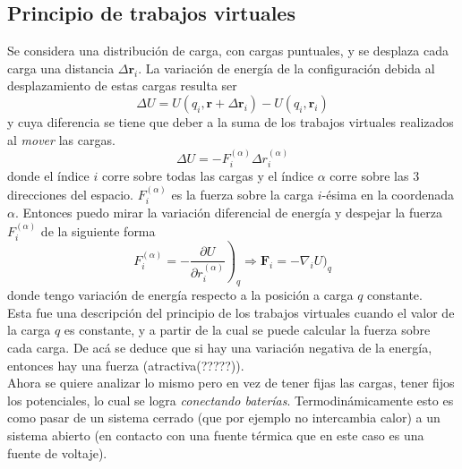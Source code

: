 \subsection{Principio de trabajos virtuales}
Se considera una distribución de carga, con cargas puntuales, y se desplaza cada carga una distancia $\Delta \textbf{r}_{i}$. La variación de energía de la configuración debida al desplazamiento de estas cargas resulta ser
\begin{equation*}
    \Delta U = 
    U(q_{i},\textbf{r}+\Delta \textbf{r}_{i})
    - U(q_{i},\textbf{r}_{i})
\end{equation*}
y cuya diferencia se tiene que deber a la suma de los trabajos virtuales realizados al \textit{mover} las cargas.
\begin{equation*}
    \Delta U = - F_{i}^{(\alpha)}\Delta r_{i}^{(\alpha)}
\end{equation*}
donde el índice $i$ corre sobre todas las cargas y el índice $\alpha$ corre sobre las 3 direcciones del espacio. $F_{i}^{(\alpha)}$ es la fuerza sobre la carga $i$-ésima en la coordenada $\alpha$. Entonces puedo mirar la variación diferencial de energía y despejar la fuerza $F_{i}^{(\alpha)}$ de la siguiente forma
\begin{equation*}
    F_{i}^{(\alpha)} 
    = 
    \left.
        - \frac{\partial U}{\partial r_{i}^{(\alpha)}}
    \right)_{q}
    \Longrightarrow
    \textbf{F}_{i} = - \nabla_{i}U\big)_{q}
\end{equation*}
donde tengo variación de energía respecto a la posición a carga $q$ constante.\\
\indent Esta fue una descripción del principio de los trabajos virtuales cuando el valor de la carga $q$ es constante, y a partir de la cual se puede calcular la fuerza sobre cada carga. De acá se deduce que si hay una variación negativa de la energía, entonces hay una fuerza (atractiva(?????)).\\
\indent Ahora se quiere analizar lo mismo pero en vez de tener fijas las cargas, tener fijos los potenciales, lo cual se logra \textit{conectando baterías}. Termodinámicamente esto es como pasar de un sistema cerrado (que por ejemplo no intercambia calor) a un sistema abierto (en contacto con una fuente térmica que en este caso es una fuente de voltaje).\\
